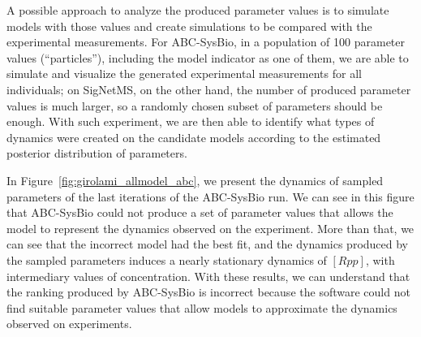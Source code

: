 A possible approach to analyze the produced parameter values is to simulate
models with those values and create simulations to be compared with
the experimental measurements. For ABC-SysBio, in a population of 100
parameter values (``particles''), including the model indicator as one of them, we
are able to simulate and visualize the generated experimental 
measurements for all individuals; on SigNetMS, on the other hand, the 
number of produced parameter values is much larger, so a randomly 
chosen subset of parameters should be enough. With such experiment, we 
are then able to identify what types of dynamics were created on the candidate 
models according to the estimated posterior distribution of parameters. 

In Figure~\ref{fig:girolami_allmodel_abc}, we present the dynamics of 
sampled parameters of the last iterations of the ABC-SysBio run. We can
see in this figure that ABC-SysBio could not produce a set of parameter
values that allows the model to represent the dynamics observed on the
experiment. More than that, we can see that the incorrect model had the
best fit, and the dynamics produced by the sampled parameters induces a
nearly stationary dynamics of $[Rpp]$, with intermediary values of
concentration. With these results, we can understand that the ranking
produced by ABC-SysBio is incorrect because the software could not find
suitable parameter values that allow models to approximate the dynamics
observed on experiments.


